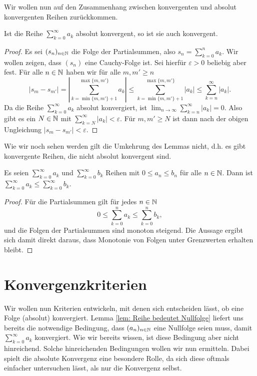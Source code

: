 \documentclass[a4paper,10pt]{article}
\begin{document}
Wir wollen nun auf den Zusammenhang zwischen konvergenten und absolut konvergenten Reihen zurückkommen.


\begin{lem}
 Ist die Reihe $\sum_{k=0}^\infty a_k$ absolut konvergent, so ist sie auch konvergent.
\end{lem}
\begin{proof}
 Es sei $(s_n)_{n \in \mathbb{N}}$ die Folge der Partialsummen, also $s_n = \sum_{k=0}^n a_k$. Wir wollen zeigen, dass $(s_n)$ eine Cauchy-Folge ist. Sei hierfür $\varepsilon > 0$ beliebig aber fest. Für alle $n \in \mathbb{N}$ haben wir für alle $m, m' \geq n$
 \[
  |s_m - s_{m'}|
  = \left| \sum_{k=\min\{m,m'\}+1}^{\max\{m,m'\}} a_k \right|
  \leq \sum_{k=\min\{m,m'\}+1}^{\max\{m,m'\}} |a_k|
  \leq \sum_{k=n}^\infty |a_k|.
 \]
 Da die Reihe $\sum_{k=0}^\infty a_k$ absolut konvergiert, ist $\lim_{n \to \infty} \sum_{k=n}^\infty |a_k| = 0$. Also gibt es ein $N \in \mathbb{N}$ mit $\sum_{k=N}^\infty |a_k| < \varepsilon$. Für $m, m' \geq N$ ist dann nach der obigen Ungleichung $|s_m - s_{m'}| < \varepsilon$.
\end{proof}


Wie wir noch sehen werden gilt die Umkehrung des Lemmas nicht, d.h. es gibt konvergente Reihen, die nicht absolut konvergent sind.


\begin{lem}
 Es seien $\sum_{k=0}^\infty a_k$ und $\sum_{k=0}^\infty b_k$ Reihen mit $0 \leq a_n \leq b_n$ für alle $n \in \mathbb{N}$. Dann ist $\sum_{k=0}^\infty a_k \leq \sum_{k=0}^\infty b_k$.
\end{lem}
\begin{proof}
 Für die Partialsummen gilt für jedes $n \in \mathbb{N}$
 \[
  0 \leq \sum_{k=0}^n a_k \leq \sum_{k=0}^n b_k,
 \]
 und die Folgen der Partialsummen sind monoton steigend. Die Aussage ergibt sich damit direkt daraus, dass Monotonie von Folgen unter Grenzwerten erhalten bleibt.
\end{proof}





\section{Konvergenzkriterien}


Wir wollen nun Kriterien entwickeln, mit denen sich entscheiden lässt, ob eine Folge (absolut) konvergiert. Lemma \ref{lem: Reihe bedeutet Nullfolge} liefert uns bereits die notwendige Bedingung, dass $(a_n)_{n \in \mathbb{N}}$ eine Nullfolge seien muss, damit $\sum_{k=0}^\infty a_k$ konvergiert. Wie wir bereits wissen, ist diese Bedingung aber nicht hinreichend. Solche hinreichenden Bedingungen wollen wir nun ermitteln. Dabei spielt die absolute Konvergenz eine besondere Rolle, da sich diese oftmals einfacher untersuchen lässt, als nur die Konvergenz selbst.
\end{document}

